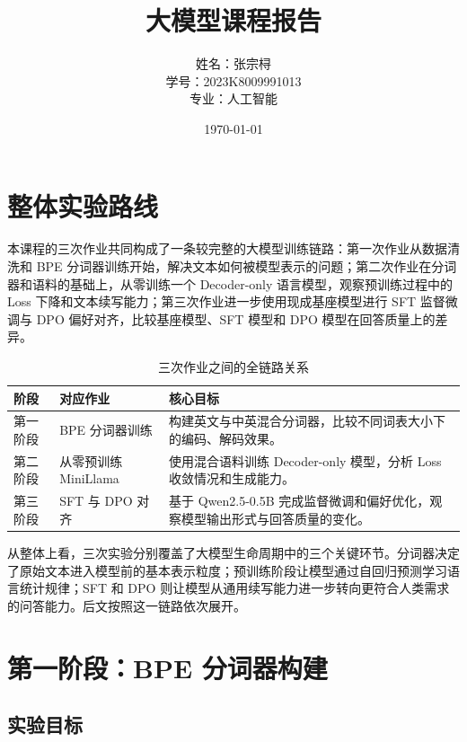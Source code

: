 \documentclass[a4paper,12pt]{ctexart}
\title{\textbf{大模型课程报告}\\}
\author{姓名：张宗桪 \\ 学号：2023K8009991013 \\ 专业：人工智能}
\date{\today}
\begin{document}
\pagestyle{plain}

\maketitle
\thispagestyle{empty}
\newpage

\tableofcontents
\newpage

\section{整体实验路线}

本课程的三次作业共同构成了一条较完整的大模型训练链路：第一次作业从数据清洗和 BPE 分词器训练开始，解决文本如何被模型表示的问题；第二次作业在分词器和语料的基础上，从零训练一个 Decoder-only 语言模型，观察预训练过程中的 Loss 下降和文本续写能力；第三次作业进一步使用现成基座模型进行 SFT 监督微调与 DPO 偏好对齐，比较基座模型、SFT 模型和 DPO 模型在回答质量上的差异。

\begin{table}[H]
    \centering
    \begin{tabularx}{\textwidth}{L{0.18\textwidth}L{0.25\textwidth}Y}
        \toprule
        阶段 & 对应作业 & 核心目标 \\
        \midrule
        第一阶段 & BPE 分词器训练 & 构建英文与中英混合分词器，比较不同词表大小下的编码、解码效果。 \\
        第二阶段 & 从零预训练 MiniLlama & 使用混合语料训练 Decoder-only 模型，分析 Loss 收敛情况和生成能力。 \\
        第三阶段 & SFT 与 DPO 对齐 & 基于 Qwen2.5-0.5B 完成监督微调和偏好优化，观察模型输出形式与回答质量的变化。 \\
        \bottomrule
    \end{tabularx}
    \caption{三次作业之间的全链路关系}
\end{table}

从整体上看，三次实验分别覆盖了大模型生命周期中的三个关键环节。分词器决定了原始文本进入模型前的基本表示粒度；预训练阶段让模型通过自回归预测学习语言统计规律；SFT 和 DPO 则让模型从通用续写能力进一步转向更符合人类需求的问答能力。后文按照这一链路依次展开。

\section{第一阶段：BPE 分词器构建}

\subsection{实验目标}
\end{document}
